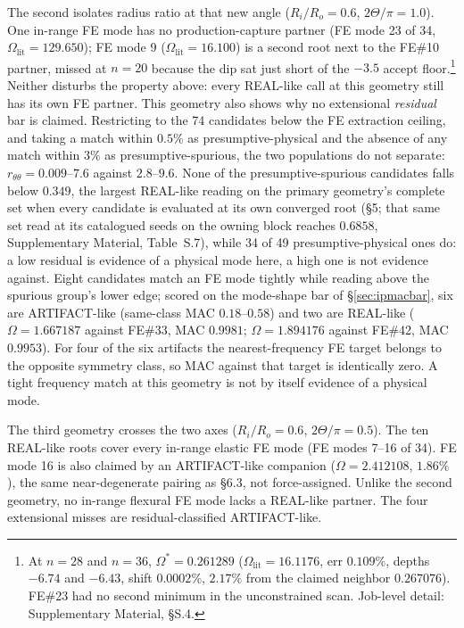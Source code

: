 \documentclass[11pt]{article}
\begin{document}
The second isolates radius ratio at that new angle
($R_i/R_o=0.6$, $2\Theta/\pi=1.0$). One in-range FE mode has no
production-capture partner (FE mode 23 of 34,
$\Omega_{\mathrm{lit}}=129.650$); FE mode 9
($\Omega_{\mathrm{lit}}=16.100$) is a second root next to the FE\#10
partner, missed at $n{=}20$ because the dip sat just short of the
$-3.5$ accept floor.\footnote{At $n{=}28$ and $n{=}36$,
$\Omega^{*}=0.261289$ ($\Omega_{\mathrm{lit}}=16.1176$, err $0.109\%$,
depths $-6.74$ and $-6.43$, shift $0.0002\%$, $2.17\%$ from the claimed
neighbor $0.267076$). FE\#23 had no second minimum in the unconstrained
scan. Job-level detail: Supplementary Material, §S.4.}
Neither disturbs the property above: every REAL-like call at this
geometry still has its own FE partner. This geometry also shows why no extensional
\emph{residual} bar is claimed. Restricting to the 74 candidates below
the FE extraction ceiling, and taking a match within $0.5\%$ as
presumptive-physical and the absence of any match within $3\%$ as
presumptive-spurious, the two populations do not separate:
$r_{\theta\theta}=0.009$--$7.6$ against $2.8$--$9.6$. None of the
presumptive-spurious candidates falls below $0.349$, the largest REAL-like
reading on the primary geometry's complete set when every candidate is
evaluated at its own converged root (\S5; that same set read at its
catalogued seeds on the owning block reaches $0.6858$, Supplementary
Material, Table~S.7), while 34 of 49 presumptive-physical ones do: a low residual
is evidence of a physical mode here, a high one is not evidence
against. Eight candidates match an FE mode tightly while reading above
the spurious group's lower edge; scored on the mode-shape bar of
\S\ref{sec:ipmacbar}, six are ARTIFACT-like (same-class MAC
$0.18$--$0.58$) and two are REAL-like ($\Omega=1.667187$ against FE\#33,
MAC $0.9981$; $\Omega=1.894176$ against FE\#42, MAC $0.9953$). For four
of the six artifacts the nearest-frequency FE target belongs to the
opposite symmetry class, so MAC against that target is identically
zero. A tight frequency match at this geometry is not by itself
evidence of a physical mode.

The third geometry crosses the two axes ($R_i/R_o=0.6$,
$2\Theta/\pi=0.5$). The ten REAL-like roots cover every in-range
elastic FE mode (FE modes 7--16 of 34). FE mode 16 is also claimed by
an ARTIFACT-like companion ($\Omega=2.412108$, $1.86\%$), the same
near-degenerate pairing as \S6.3, not force-assigned. Unlike the
second geometry, no in-range flexural FE mode lacks a REAL-like
partner. The four extensional misses are residual-classified
ARTIFACT-like.
\end{document}

